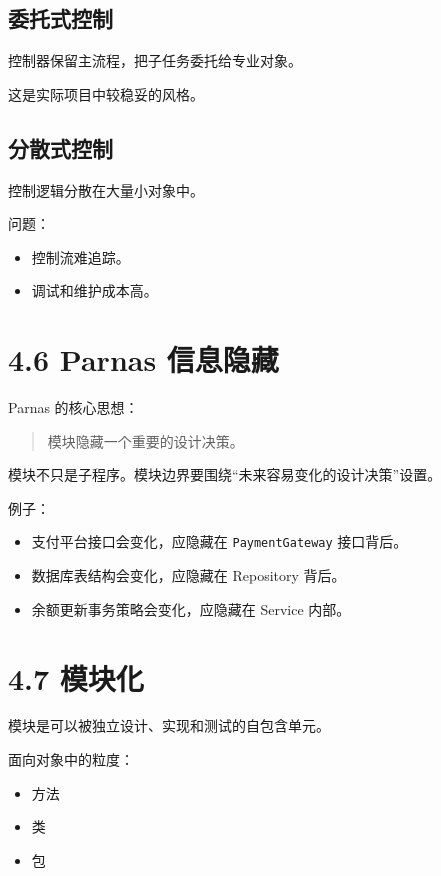 \documentclass[UTF8,zihao=-4]{ctexart}
\begin{document}
\subsection{委托式控制}

控制器保留主流程，把子任务委托给专业对象。

这是实际项目中较稳妥的风格。

\subsection{分散式控制}

控制逻辑分散在大量小对象中。

问题：

\begin{itemize}
\item 控制流难追踪。
\item 调试和维护成本高。
\end{itemize}

\section{4.6 Parnas 信息隐藏}

Parnas 的核心思想：

\begin{quote}
模块隐藏一个重要的设计决策。
\end{quote}

模块不只是子程序。模块边界要围绕“未来容易变化的设计决策”设置。

例子：

\begin{itemize}
\item 支付平台接口会变化，应隐藏在 \texttt{PaymentGateway} 接口背后。
\item 数据库表结构会变化，应隐藏在 Repository 背后。
\item 余额更新事务策略会变化，应隐藏在 Service 内部。
\end{itemize}

\section{4.7 模块化}

模块是可以被独立设计、实现和测试的自包含单元。

面向对象中的粒度：

\begin{itemize}
\item 方法
\item 类
\item 包
\end{itemize}
\end{document}
